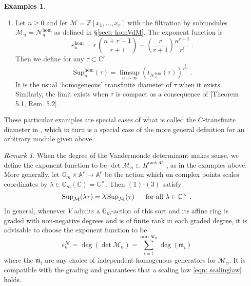 \documentclass[a4paper,10pt]{amsart}
\theoremstyle{definition}
\newtheorem{ex}[thm]{Examples}
\theoremstyle{remark}
\newtheorem{rem}[thm]{Remark}
\numberwithin{equation}{section}
\newcommand{\Z}{\mathbb Z}
\newcommand{\C}{\mathbb C}
\newcommand{\m}{\mathfrak{m}}
\newcommand{\ts}{\mathrm{Sup}}
\newcommand{\Gm}{\mathbb{G}_m}
\newcommand{\rank}{\mathrm{rank}}
\newcommand{\0}{\color{blue}{\mathsf{0}}}
\begin{document}
\begin{ex}
\begin{enumerate}
   
   
   \item  Let $n\geq 0$ and let $\mathcal{M}=\Z[x_1,\ldots, x_r]$  with the filtration by submodules $\mathcal{M}_n =  \mathcal{N}_n^{\mathrm{hom}}$ as defined in 
   \S\ref{sect: homVdM}. The exponent function is 
    \begin{equation}
  \label{exponent:hom}
  e^{\mathrm{hom}}_{n} =r\, \binom{n+r-1}{r+1}  \sim  \left(\frac{r}{r+1} \right) \frac{n^{r+1}}{r!}  \ .
    \end{equation} 
Then we define for any $\tau \subset \C^r$ 
  \[ \ts_{n}^{\hom} (\tau) =    \limsup_{n\rightarrow \infty}   \left(t_{\mathcal{N}^{\hom}_{ n}}(\tau) \right)^{\frac{1}{e^{\mathcal{M}}_n}}  \ . \]
  It is   the usual `homogeneous'  transfinite diameter of $\tau$  when it  exists.   Similarly, the limit exists when $\tau$ is compact as a consequence of  \cite{BBL2018}[Theorem 5.1, Rem. 5.2].
   \\
    \end{enumerate}
  These particular examples are special cases of what is  called  the $C$-transfinite diameter  in \cite{LevenbergWielonsky}, which in turn is a special case of the more general definition  for an arbitrary module given above.
   \end{ex}
   
   
   \begin{rem} 
   When the degree   of the Vandermonde determinant makes sense, we define  the exponent function to be  $\det {\mathcal{M}_n} \subset R^{\rank  \,  \mathcal{M}_n}$, as in the examples above.
  More generally, let $\Gm \times \mathbb{A}^r \rightarrow \mathbb{A}^r$ be  the action which on complex points scales  coordinates by $\lambda \in  \Gm(\C) = \C^{\times}$. Then  $(1)$-$(3)$ satisfy
  \begin{equation} \label{eqn: scalinglaw}
  \ts_{\mathcal{M}}(\lambda \tau) =  \lambda \, \ts_{\mathcal{M}}(\tau)\ \quad \hbox{ for all } \lambda \in \C^{\times} \ .  
  \end{equation} 
  In general, whenever $V$ admits a $\Gm$-action of this sort and  its affine ring is graded with  non-negative degrees and is of finite rank in each graded degree,  it is advisable to choose the   exponent function to be 
  \[ e_n^{\mathcal{M}} = \deg  \left(\det \mathcal{M}_n\right) = \sum_{i=1}^{\rank \mathcal{M}_n} \deg(\m_i) \]
  where the $\m_i$ are any choice of independent  homogenous generators for $\mathcal{M}_n$. 
 It is compatible with the grading and guarantees  that  a  scaling law  \eqref{eqn: scalinglaw} holds.
 \end{rem}
 
\end{document}
